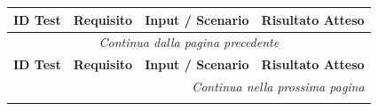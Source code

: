 \begingroup
\renewcommand{\arraystretch}{1.5}
\small
\begin{longtable}[c]{|p{}|p{}|p{}|p{}|}
    
    \hline
    \textbf{ID Test} & \textbf{Requisito} & \textbf{Input / Scenario} & \textbf{Risultato Atteso} \\ \hline
    \endfirsthead

    \hline
    \multicolumn{4}{|c|}{{\footnotesize\itshape Continua dalla pagina precedente}} \\ \hline
    \textbf{ID Test} & \textbf{Requisito} & \textbf{Input / Scenario} & \textbf{Risultato Atteso} \\ \hline
    \endhead

    \hline
    \multicolumn{4}{|r|}{{\footnotesize\itshape Continua nella prossima pagina}} \\ \hline
    \endfoot

    \hline
    \endlastfoot


\end{longtable}
